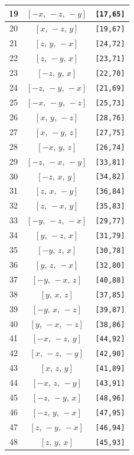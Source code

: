 \documentclass[fleqn,8pt]{jsarticle}
\begin{document}
\begin{longtable}{ccc}
19 & $\left[ - x,\, - z,\, - y \right]$ & {\tt [17,65]} \\ \hline
20 & $\left[ x,\, - z,\, y \right]$ & {\tt [19,67]} \\ \hline
21 & $\left[ z,\, y,\, - x \right]$ & {\tt [24,72]} \\ \hline
22 & $\left[ z,\, - y,\, x \right]$ & {\tt [23,71]} \\ \hline
23 & $\left[ - z,\, y,\, x \right]$ & {\tt [22,70]} \\ \hline
24 & $\left[ - z,\, - y,\, - x \right]$ & {\tt [21,69]} \\ \hline
25 & $\left[ - x,\, - y,\, - z \right]$ & {\tt [25,73]} \\ \hline
26 & $\left[ x,\, y,\, - z \right]$ & {\tt [28,76]} \\ \hline
27 & $\left[ x,\, - y,\, z \right]$ & {\tt [27,75]} \\ \hline
28 & $\left[ - x,\, y,\, z \right]$ & {\tt [26,74]} \\ \hline
29 & $\left[ - z,\, - x,\, - y \right]$ & {\tt [33,81]} \\ \hline
30 & $\left[ - z,\, x,\, y \right]$ & {\tt [34,82]} \\ \hline
31 & $\left[ z,\, x,\, - y \right]$ & {\tt [36,84]} \\ \hline
32 & $\left[ z,\, - x,\, y \right]$ & {\tt [35,83]} \\ \hline
33 & $\left[ - y,\, - z,\, - x \right]$ & {\tt [29,77]} \\ \hline
34 & $\left[ y,\, - z,\, x \right]$ & {\tt [31,79]} \\ \hline
35 & $\left[ - y,\, z,\, x \right]$ & {\tt [30,78]} \\ \hline
36 & $\left[ y,\, z,\, - x \right]$ & {\tt [32,80]} \\ \hline
37 & $\left[ - y,\, - x,\, z \right]$ & {\tt [40,88]} \\ \hline
38 & $\left[ y,\, x,\, z \right]$ & {\tt [37,85]} \\ \hline
39 & $\left[ - y,\, x,\, - z \right]$ & {\tt [39,87]} \\ \hline
40 & $\left[ y,\, - x,\, - z \right]$ & {\tt [38,86]} \\ \hline
41 & $\left[ - x,\, - z,\, y \right]$ & {\tt [44,92]} \\ \hline
42 & $\left[ x,\, - z,\, - y \right]$ & {\tt [42,90]} \\ \hline
43 & $\left[ x,\, z,\, y \right]$ & {\tt [41,89]} \\ \hline
44 & $\left[ - x,\, z,\, - y \right]$ & {\tt [43,91]} \\ \hline
45 & $\left[ - z,\, - y,\, x \right]$ & {\tt [48,96]} \\ \hline
46 & $\left[ - z,\, y,\, - x \right]$ & {\tt [47,95]} \\ \hline
47 & $\left[ z,\, - y,\, - x \right]$ & {\tt [46,94]} \\ \hline
48 & $\left[ z,\, y,\, x \right]$ & {\tt [45,93]} \\
\end{longtable}
\end{document}
